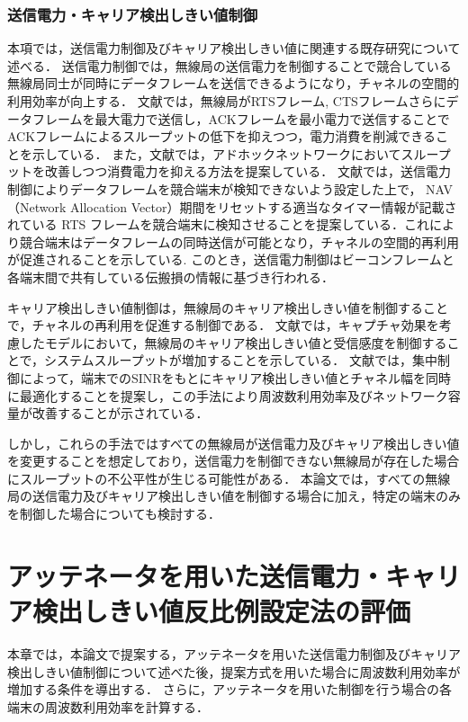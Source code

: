 \documentclass[master]{kuisthesis}		%
\begin{document}
\subsubsection{送信電力・キャリア検出しきい値制御}
本項では，送信電力制御及びキャリア検出しきい値に関連する既存研究について述べる．
送信電力制御では，無線局の送信電力を制御することで競合している無線局同士が同時にデータフレームを送信できるようになり，チャネルの空間的利用効率が向上する\cite{APowerControlMAC,Apowercontrolled,performance_enhancement,performance_evaluation}．
文献\cite{APowerControlMAC}では，無線局がRTSフレーム, CTSフレームさらにデータフレームを最大電力で送信し，ACKフレームを最小電力で送信することでACKフレームによるスループットの低下を抑えつつ，電力消費を削減できることを示している．
また，文献\cite{Apowercontrolled}では，アドホックネットワークにおいてスループットを改善しつつ消費電力を抑える方法を提案している．
文献\cite{performance_enhancement}では，送信電力制御によりデータフレームを競合端末が検知できないよう設定した上で， NAV（Network Allocation Vector）期間をリセットする適当なタイマー情報が記載されている RTS フレームを競合端末に検知させることを提案している．これにより競合端末はデータフレームの同時送信が可能となり，チャネルの空間的再利用が促進されることを示している.
このとき，送信電力制御はビーコンフレームと各端末間で共有している伝搬損の情報に基づき行われる．

キャリア検出しきい値制御は，無線局のキャリア検出しきい値を制御することで，チャネルの再利用を促進する制御である\cite{AdaptiveCSMAfor,centralized_control,tuning_the_carrier}．
文献\cite{AdaptiveCSMAfor}では，キャプチャ効果を考慮したモデルにおいて，無線局のキャリア検出しきい値と受信感度を制御することで，システムスループットが増加することを示している．
文献\cite{centralized_control}では，集中制御によって，端末でのSINRをもとにキャリア検出しきい値とチャネル幅を同時に最適化することを提案し，この手法により周波数利用効率及びネットワーク容量が改善することが示されている．

しかし，これらの手法ではすべての無線局が送信電力及びキャリア検出しきい値を変更することを想定しており，送信電力を制御できない無線局が存在した場合にスループットの不公平性が生じる可能性がある．
本論文では，すべての無線局の送信電力及びキャリア検出しきい値を制御する場合に加え，特定の端末のみを制御した場合についても検討する．
\section{アッテネータを用いた送信電力・キャリア検出しきい値反比例設定法の評価} \label{提案方式}
本章では，本論文で提案する，アッテネータを用いた送信電力制御及びキャリア検出しきい値制御について述べた後，提案方式を用いた場合に周波数利用効率が増加する条件を導出する．
さらに，アッテネータを用いた制御を行う場合の各端末の周波数利用効率を計算する．
\end{document}
